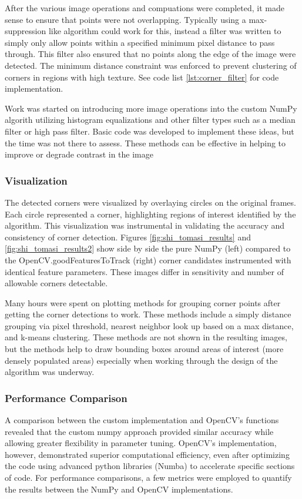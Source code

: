 \documentclass[11pt, conference, letterpaper]{IEEEtran}
\begin{document}
After the various image operations and compuations were completed, it made sense to ensure that points were not overlapping. Typically using a max-suppression like algorithm could work for this, instead a filter was written to simply only allow points within a specified minimum pixel distance to pass through. This filter also ensured that no points along the edge of the image were detected. The minimum distance constraint was enforced to prevent clustering of corners in regions with high texture. See code list \ref{lst:corner_filter} for code implementation.

Work was started on introducing more image operations into the custom NumPy algorith utilizing histogram equalizations and other filter types such as a median filter or high pass filter. Basic code was developed to implement these ideas, but the time was not there to assess. These methods can be effective in helping to improve or degrade contrast in the image
\bigskip

\subsubsection{Visualization}
The detected corners were visualized by overlaying circles on the original frames. Each circle represented a corner, highlighting regions of interest identified by the algorithm. This visualization was instrumental in validating the accuracy and consistency of corner detection. Figures \ref{fig:shi_tomasi_results} and \ref{fig:shi_tomasi_results2} show side by side the pure NumPy (left) compared to the OpenCV.goodFeaturesToTrack (right) corner candidates instrumented with identical feature parameters. These images differ in sensitivity and number of allowable corners detectable.

Many hours were spent on plotting methods for grouping corner points after getting the corner detections to work. These methods include a simply distance grouping via pixel threshold, nearest neighbor look up based on a max distance, and k-means clustering. These methods are not shown in the resulting images, but the methods help to draw bounding boxes around areas of interest (more densely populated areas) especially when working through the design of the algorithm was underway.
\bigskip

\subsubsection{Performance Comparison}
A comparison between the custom implementation and OpenCV's functions revealed that the custom numpy approach provided similar accuracy while allowing greater flexibility in parameter tuning. OpenCV's implementation, however, demonstrated superior computational efficiency, even after optimizing the code using advanced python libraries (Numba) to accelerate specific sections of code. For performance comparisons, a few metrics were employed to quantify the results between the NumPy and OpenCV implementations.
\end{document}
